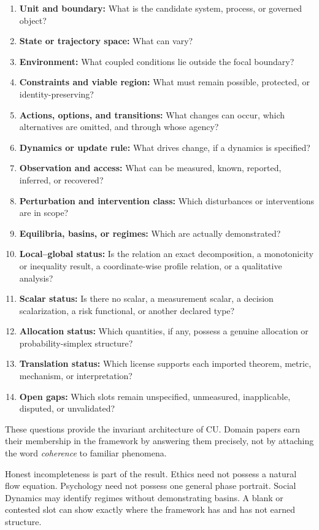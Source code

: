 \documentclass[
  11pt,
]{article}
\providecommand{\tightlist}{%
  \setlength{\itemsep}{0pt}\setlength{\parskip}{0pt}}
\begin{document}
\begin{enumerate}
\def\labelenumi{\arabic{enumi}.}
\tightlist
\item
  \textbf{Unit and boundary:} What is the candidate system, process, or
  governed object?
\item
  \textbf{State or trajectory space:} What can vary?
\item
  \textbf{Environment:} What coupled conditions lie outside the focal
  boundary?
\item
  \textbf{Constraints and viable region:} What must remain possible,
  protected, or identity-preserving?
\item
  \textbf{Actions, options, and transitions:} What changes can occur,
  which alternatives are omitted, and through whose agency?
\item
  \textbf{Dynamics or update rule:} What drives change, if a dynamics is
  specified?
\item
  \textbf{Observation and access:} What can be measured, known,
  reported, inferred, or recovered?
\item
  \textbf{Perturbation and intervention class:} Which disturbances or
  interventions are in scope?
\item
  \textbf{Equilibria, basins, or regimes:} Which are actually
  demonstrated?
\item
  \textbf{Local--global status:} Is the relation an exact decomposition,
  a monotonicity or inequality result, a coordinate-wise profile
  relation, or a qualitative analysis?
\item
  \textbf{Scalar status:} Is there no scalar, a measurement scalar, a
  decision scalarization, a risk functional, or another declared type?
\item
  \textbf{Allocation status:} Which quantities, if any, possess a
  genuine allocation or probability-simplex structure?
\item
  \textbf{Translation status:} Which license supports each imported
  theorem, metric, mechanism, or interpretation?
\item
  \textbf{Open gaps:} Which slots remain unspecified, unmeasured,
  inapplicable, disputed, or unvalidated?
\end{enumerate}

These questions provide the invariant architecture of CU. Domain papers
earn their membership in the framework by answering them precisely, not
by attaching the word \emph{coherence} to familiar phenomena.

Honest incompleteness is part of the result. Ethics need not possess a
natural flow equation. Psychology need not possess one general phase
portrait. Social Dynamics may identify regimes without demonstrating
basins. A blank or contested slot can show exactly where the framework
has and has not earned structure.
\end{document}
